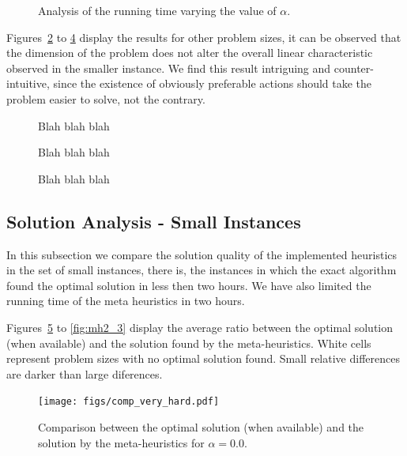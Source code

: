 \begin{figure}
\centering
\missingfigure[figwidth=8cm]{}
\caption{Analysis of the running time varying the value of $\alpha$.}
\label{fig:alpha_5_5}
\end{figure}

Figures~\ref{fig:alpha_10_5} to \ref{fig:alpha_10_10} display the results for other problem sizes,
it can be observed that the dimension of the problem does not alter the overall linear characteristic observed in
the smaller instance. We find this result intriguing and counter-intuitive, since the existence of obviously
preferable actions should take the problem easier to solve, not the contrary.

\begin{figure}
\centering
\missingfigure[figwidth=8cm]{}
\caption{Blah blah blah}
\label{fig:alpha_10_5}
\end{figure}

\begin{figure}
\centering
\missingfigure[figwidth=8cm]{}
\caption{Blah blah blah}
\label{fig:alpha_5_10}
\end{figure}

\begin{figure}
\centering
\missingfigure[figwidth=8cm]{}
\caption{Blah blah blah}
\label{fig:alpha_10_10}
\end{figure}

\subsection{Solution Analysis - Small Instances}

In this subsection we compare the solution quality of the implemented heuristics
in the set of small instances, there is, the instances in which the exact algorithm
found the optimal solution in less then two hours. We have also limited the running time
of the meta heuristics in two hours.

Figures~\ref{fig:mh1_1} to \ref{fig:mh2_3} display the average ratio between the optimal solution (when available) 
and the solution found by the meta-heuristics. White cells represent problem sizes with no
optimal solution found. Small relative differences are darker than large diferences.

\begin{figure}
\centering
\texttt{[image: figs/comp\_very\_hard.pdf]}
\caption{Comparison between the optimal solution (when available) 
and the solution by the meta-heuristics for $\alpha=0.0$.}
\label{fig:mh1_1}
\end{figure}

